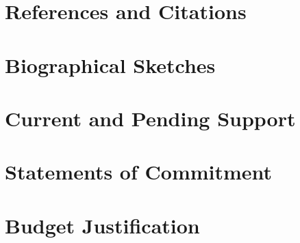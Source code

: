 \documentclass[11pt]{article}
\begin{document}
\clearpage

\section{References and Citations}

\vspace{-1cm}



\clearpage

\section{Biographical Sketches}

\clearpage

\section{Current and Pending Support}

\clearpage

\section{Statements of Commitment}

\clearpage

\section{Budget Justification}
\end{document}
